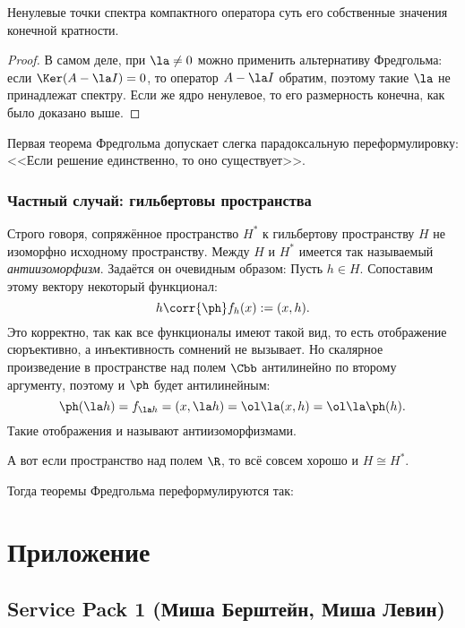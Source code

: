 \documentclass[a4paper]{article}
\begin{document}
\begin{imp}
Ненулевые точки спектра компактного оператора суть его собственные значения
конечной кратности.
\end{imp}
\begin{proof}
В самом деле, при $\la \neq 0$ можно применить альтернативу Фредгольма:
если $\Ker(A - \la I) = 0$, то оператор $A - \la I$ обратим,
поэтому такие $\la$ не принадлежат спектру. Если же ядро ненулевое,
то его размерность конечна, как было доказано выше.
\end{proof}

\begin{note}
Первая теорема Фредгольма допускает слегка парадоксальную переформулировку:
<<Если решение единственно, то оно существует>>.
\end{note}

\subsubsection{Частный случай: гильбертовы пространства}

Строго говоря, сопряжённое пространство $H^*$ к гильбертову пространству $H$ не изоморфно
исходному пространству. Между $H$ и $H^*$ имеется так называемый \emph{антиизоморфизм}.
Задаётся он очевидным образом: Пусть $h \in H$. Сопоставим этому вектору некоторый функционал:
$$h \corr{\ph} f_h(x) := (x,h).$$
Это  корректно, так как все функционалы имеют такой вид, то есть отображение сюръективно,
а инъективность сомнений не вызывает. Но скалярное произведение в пространстве над
полем $\Cbb$ антилинейно по второму аргументу, поэтому и $\ph$ будет антилинейным:
$$\ph(\la h) = f_{\la h} = (x,\la h) = \ol \la (x,h) = \ol \la \ph(h).$$
Такие отображения и называют антиизоморфизмами.

А вот если пространство над полем $\R$, то всё совсем хорошо и $H \cong H^*$.

Тогда теоремы Фредгольма переформулируются так:




\section{Приложение}

\subsection{Service Pack 1 (Миша Берштейн, Миша Левин)}
\end{document}
